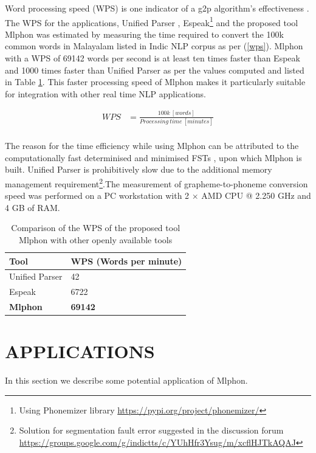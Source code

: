 \documentclass{ieeeaccess}
\begin{document}
Word processing speed (WPS) is one indicator of a g2p algorithm's effectiveness \cite{mdpi2022ruleg2p}. The WPS  for the applications, Unified Parser \cite{baby2016unified}, Espeak\footnote{Using Phonemizer library \url{https://pypi.org/project/phonemizer/}} and the proposed tool Mlphon was estimated by measuring the time required to convert the 100k common words in Malayalam listed in Indic NLP corpus \cite{kunchukuttan2020ai4bharat} as per (\ref{wps}). Mlphon with a WPS of 69142 words per second is at least ten times faster than Espeak and 1000 times faster than Unified Parser as per the values computed and listed in Table \ref{speed}. This faster processing speed of  Mlphon makes it particularly suitable for integration with other real time NLP applications.

\begin{equation}
\label{wps}
\begin{split}
WPS & =\frac{100k\ [words]}{Processing\ time\ [minutes]}  \\ 
\end{split}
\end{equation}

 The reason for the time efficiency while using Mlphon can be attributed to the computationally fast determinised and minimised FSTs \cite{mohri-1997-finite}, upon which Mlphon is built. 
Unified Parser is prohibitively slow due to the additional memory management requirement\footnote{Solution for segmentation fault error suggested in the discussion forum \url{https://groups.google.com/g/indictts/c/YUhHfr3Ysug/m/xcflHJTkAQAJ}}.The measurement of grapheme-to-phoneme conversion speed was performed on a PC workstation with 2 $\times$ AMD CPU @ 2.250 GHz and 4 GB of RAM. %




\begin{table}[h]
\caption{Comparison of the WPS of the proposed tool Mlphon with other openly available tools }
\label{speed}
\begin{tabular}{l|l}
\hline \hline
    Tool &  WPS (Words per minute)\\ \hline
    Unified Parser & 42\\
    Espeak & 6722 \\
    \textbf{Mlphon} &  \textbf{69142} \\
    \hline
\end{tabular}
\end{table}


\section{APPLICATIONS}
\label{applications}
In this section we describe some potential application of Mlphon.
\end{document}
